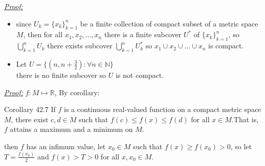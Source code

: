 \documentclass{book}
\begin{document}
\begin{tcolorbox}[enhanced,attach boxed title to top center={yshift=-3mm,yshifttext=-1mm},
colback=blue!5!white,colframe=blue!75!black,colbacktitle=red!80!black,
title=Exercise 42.3:,fonttitle=\bfseries,
boxed title style={size=small,colframe=red!50!black} ]
\textit{\color{blue}\underline{Proof:}}
\begin{itemize}
\item since $U_k=\{x_k\}_{k=1}^{n}$ be a finite collection of compact subset of a metric space $M$, then for
all $x_1,x_2,...,x_n$ there is a finite 
subcover $U^*$ of $\{x_k\}_{k=1}^{n}$, so $\bigcup_{k=1}^{n}U_k$ there exists subcover 
$\bigcup_{k=1}^{n}U^*_k$ so $x_1 \cup x_2 \cup...\cup x_n$ is 
compact.
\item Let $U=\{(n,n+\frac{3}{2}):\forall n\in \mathbb{N}\}$\\
there is no finite subcover so $U$ is not compact.
\end{itemize}     
\end{tcolorbox}



\begin{tcolorbox}[enhanced,attach boxed title to top center={yshift=-3mm,yshifttext=-1mm},
colback=blue!5!white,colframe=blue!75!black,colbacktitle=red!80!black,
title=Exercise 42.6:,fonttitle=\bfseries,
boxed title style={size=small,colframe=red!50!black} ]
\textit{\color{blue}\underline{Proof:}} $f:M\longmapsto\mathbb{R}$, By corollary:
\begin{tcolorbox}[colback=red!5!white,colframe=red!75!black]
{\color{red}Corollary 42.7} If $f$ is a continuous real-valued function on a compact metric
space $M$, there exist $c,d\in M$ such that $f(c)\leq f(x)\leq f(d)$ for all $x\in M$.That is, $f$ attains a 
maximum and a minimum on $M$.  
\end{tcolorbox}
then $f$ has an infimum value, let $x_0\in M$ such that $f(x)\geq f(x_0)>0$, so let $T=\frac{f(x_0)}{2}$ and 
$f(x)>T>0$ for all $x,x_0\in M$.
\end{tcolorbox}



\end{document}
